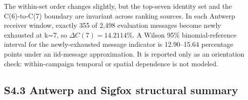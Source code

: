 \documentclass[journal,onecolumn,10pt]{IEEEtran}
\begin{document}
The within-set order changes slightly, but the top-seven identity set and the C(6)-to-C(7) boundary are invariant across ranking sources. In each Antwerp receiver window, exactly 355 of 2,498 evaluation messages become newly exhausted at k=7, so \(\Delta C(7)=14.2114\%\). A Wilson 95\% binomial-reference interval for the newly-exhausted message indicator is 12.90--15.64 percentage points under an iid-message approximation. It is reported only as an orientation check: within-campaign temporal or spatial dependence is not modeled.

\subsection*{S4.3 Antwerp and Sigfox structural summary}\label{s4.3-antwerp-and-sigfox-structural-summary}
\end{document}
